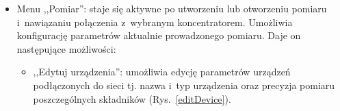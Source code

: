 \begin{itemize}
\begin{itemize}
\item ,,Edytuj obiekty'': umożliwia edycję obiektów będących przedmiotem pomiaru (Rys.~\ref{editObject}).

\begin{figure}[!htb]
\centering 		
  \hspace{2mm}
\caption{Okno edycji obiektów} 	
\label{editObject}
\end{figure}

\end{itemize}
\item Menu ,,Pomiar'': staje się aktywne po utworzeniu lub otworzeniu pomiaru i~nawiązaniu połączenia z~wybranym koncentratorem. Umożliwia konfigurację parametrów aktualnie prowadzonego pomiaru. Daje on następujące możliwości:
\begin{itemize}
\item ,,Edytuj urządzenia'': umożliwia edycję parametrów urządzeń podłączonych do sieci tj. nazwa i~typ urządzenia oraz precyzja pomiaru poszczególnych składników (Rys.~\ref{editDevice}).


\end{itemize}
\end{itemize}
